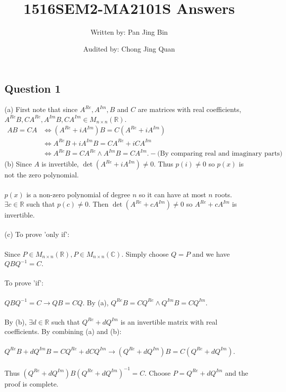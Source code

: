 \documentclass{article}
\title{1516SEM2-MA2101S Answers}
\author{Written by: Pan Jing Bin}
\date{Audited by: Chong Jing Quan}
\begin{document}
\maketitle
\subsection*{Question 1}
(a) First note that since $A^{Re},A^{Im},B$ and $C$ are matrices with real coefficients, $A^{Re}B,CA^{Re},A^{Im}B, CA^{Im} \in M_{n\times n}(\mathbb{R})$.\begin{align*}
AB=CA &\iff (A^{Re} + iA^{Im})B = C(A^{Re} + iA^{Im})\\ &\iff A^{Re}B + iA^{Im}B = CA^{Re} + iCA^{Im}\\ &\iff A^{Re}B = CA^{Re} \land A^{Im}B = CA^{Im}. - \text{(By comparing real and imaginary parts)}
\end{align*}
(b) Since $A$ is invertible, $\det(A^{Re} + iA^{Im}) \neq 0.$ Thus $p(i) \neq 0$ so $p(x)$ is not the zero polynomial.\\\\
$p(x)$ is a non-zero polynomial of degree $n$ so it can have at most $n$ roots. $\exists c\in \mathbb{R}$ such that $p(c) \neq 0.$ Then $\det(A^{Re} + cA^{Im}) \neq 0$ so $A^{Re} + cA^{Im}$ is invertible.\\\\
(c) To prove 'only if':\\\\
Since $P\in M_{n\times n}(\mathbb{R}), P \in M_{n\times n}(\mathbb{C}).$ Simply choose $Q = P$ and we have $QBQ^{-1} = C$.\\\\
To prove 'if':\\\\
$QBQ^{-1} = C \to QB = CQ.$ By (a), $Q^{Re}B = CQ^{Re} \land Q^{Im}B = CQ^{Im}.$\\\\
By (b), $\exists d\in\mathbb{R}$ such that $Q^{Re} + dQ^{Im}$ is an invertible matrix with real coefficients. By combining (a) and (b):\\\\
$Q^{Re}B + dQ^{Im}B = CQ^{Re} + dCQ^{Im} \to (Q^{Re} + dQ^{Im})B = C(Q^{Re}+dQ^{Im})$.\\\\
Thus $(Q^{Re} + dQ^{Im})B(Q^{Re} + dQ^{Im})^{-1} = C.$ Choose $P = Q^{Re} + dQ^{Im}$ and the proof is complete.\\\\
\end{document}
